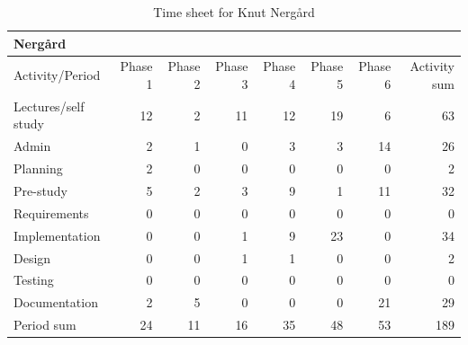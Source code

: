 \documentclass[11pt]{book}
\begin{document}
\begin{table}[H]
\centering
\begin{tabular}{| l | r | r | r | r | r | r | r |}
    \hline
    Nergård             &          &          &          &          &             &             &              \\ \hline         
    Activity/Period     & Phase 1  & Phase 2  & Phase  3 & Phase 4  & Phase 5     & Phase 6     & Activity sum \\ \hline
    Lectures/self study & 12 & 2 & 11 & 12 & 19 & 6 & 63\\ \hline         
    Admin & 2 & 1 & 0 & 3 & 3 & 14 & 26\\ \hline         
    Planning & 2 & 0 & 0 & 0 & 0 & 0 & 2\\ \hline         
    Pre-study & 5 & 2 & 3 & 9 & 1 & 11 & 32\\ \hline         
    Requirements & 0 & 0 & 0 & 0 & 0 & 0 & 0\\ \hline         
    Implementation & 0 & 0 & 1 & 9 & 23 & 0 & 34\\ \hline         
    Design & 0 & 0 & 1 & 1 & 0 & 0 & 2\\ \hline         
    Testing & 0 & 0 & 0 & 0 & 0 & 0 & 0\\ \hline         
    Documentation & 2 & 5 & 0 & 0 & 0 & 21 & 29\\ \hline         
    Period sum & 24 & 11 & 16 & 35 & 48 & 53 & 189\\ \hline         
\end{tabular}
\caption{Time sheet for Knut Nergård}
\label{tab:appendix_timesheets_knut}
\end{table}
\end{document}
